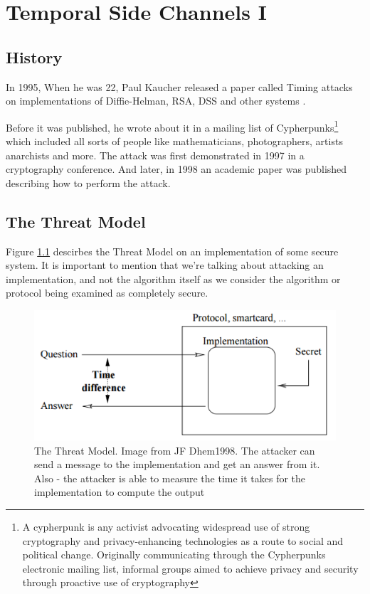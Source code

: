 \chapter{Temporal Side Channels I} 

\section{History}
In 1995, When he was 22, Paul Kaucher released a paper called Timing attacks on implementations of Diffie-Helman, RSA, DSS and other systems \cite{kocher1996timing}.

Before it was published, he wrote about it in a mailing list of Cypherpunks\footnote{A cypherpunk is any activist advocating widespread use of strong cryptography and privacy-enhancing technologies as a route to social and political change. Originally communicating through the Cypherpunks electronic mailing list, informal groups aimed to achieve privacy and security through proactive use of cryptography}
which included all sorts of people like mathematicians, photographers, artists anarchists and more.
The attack was first demonstrated in 1997 in a cryptography conference.
And later, in 1998 an academic paper was published describing how to perform the attack.



\section{The Threat Model}
Figure \ref{c1_fig_threat_model} descirbes the Threat Model on an implementation of some secure system.
It is important to mention that we're talking about attacking an implementation, and not the algorithm itself as we consider the algorithm or protocol being examined as completely secure.

\begin{figure}[H]
    \centering
    \includegraphics{images/chapter_1/threat_model.png}
    \caption{The Threat Model. Image from JF Dhem1998.
     The attacker can send a message to the implementation and get an answer from it. Also - the attacker is able to measure the time it takes for the implementation to compute the output}
    \label{c1_fig_threat_model}
\end{figure}

